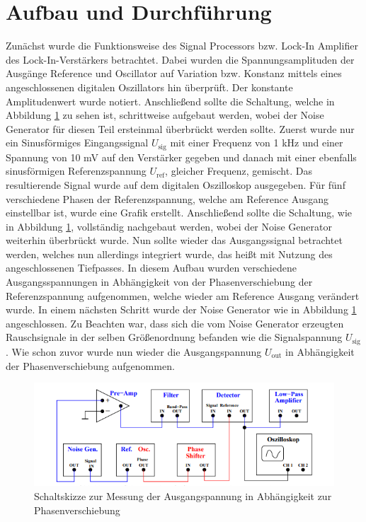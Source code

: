 \section{Aufbau und Durchführung}
\label{sec:Durchführung}
Zunächst wurde die Funktionsweise des Signal Processors bzw. Lock-In Amplifier des Lock-In-Verstärkers betrachtet.
Dabei wurden die Spannungsamplituden der Ausgänge Reference und Oscillator
auf Variation bzw. Konstanz mittels eines angeschlossenen digitalen Oszillators hin
überprüft. Der konstante Amplitudenwert wurde notiert.
Anschließend sollte die Schaltung, welche in Abbildung \ref{fig:aufbau1} zu sehen ist, schrittweise aufgebaut werden, wobei der Noise Generator für diesen
Teil ersteinmal überbrückt werden sollte. Zuerst wurde nur ein Sinusförmiges Eingangssignal $U_\text{sig}$ mit einer Frequenz von 1 kHz und einer Spannung von 10 mV auf den
Verstärker gegeben und danach mit einer ebenfalls sinusförmigen Referenzspannung $U_\text{ref}$, gleicher Frequenz, gemischt. Das resultierende Signal wurde auf dem digitalen Oszilloskop
ausgegeben. Für fünf verschiedene Phasen der Referenzspannung, welche am Reference Ausgang einstellbar ist, wurde eine Grafik erstellt.
Anschließend sollte die Schaltung, wie in Abbildung \ref{fig:aufbau1}, vollständig nachgebaut werden, wobei der Noise Generator weiterhin überbrückt wurde.
Nun sollte wieder das Ausgangssignal betrachtet werden, welches nun allerdings integriert wurde, das heißt mit Nutzung des angeschlossenen Tiefpasses. In diesem Aufbau wurden verschiedene Ausgangsspannungen 
in Abhängigkeit von der Phasenverschiebung der Referenzspannung aufgenommen, welche wieder am Reference Ausgang verändert wurde.
In einem nächsten Schritt wurde der Noise Generator wie in Abbildung \ref{fig:aufbau1} angeschlossen. Zu Beachten war, dass sich die vom Noise Generator erzeugten Rauschsignale in der
selben Größenordnung befanden wie die Signalspannung $U_\text{sig}$. Wie schon zuvor wurde nun wieder die Ausgangspannung $U_\text{out}$ in Abhängigkeit der Phasenverschiebung aufgenommen.
\begin{figure}
  \centering
  \includegraphics{content/abbildung2.png}
  \caption{Schaltskizze zur Messung der Ausgangspannung in Abhängigkeit zur Phasenverschiebung \cite[4]{V303}}
  \label{fig:aufbau1}
\end{figure}
